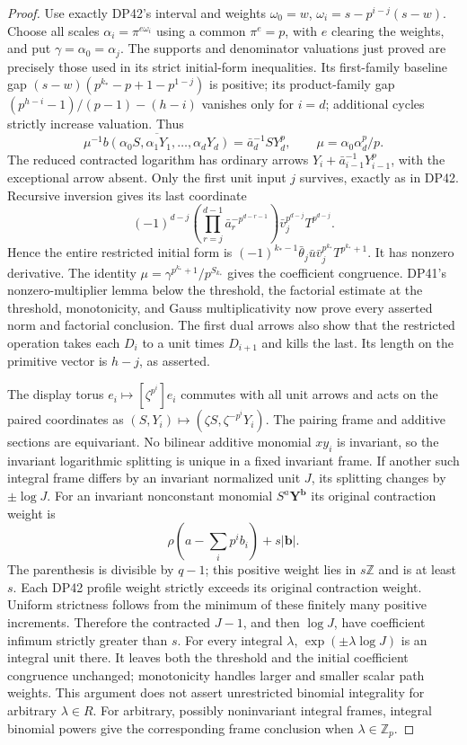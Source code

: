 \documentclass[11pt,a4paper]{article}
\theoremstyle{definition}\newtheorem{remark}[theorem]{Remark}
\newcommand{\Z}{\mathbb Z}\newcommand{\Q}{\mathbb Q}\newcommand{\F}{\mathbb F}
\begin{document}
\begin{proof}
Use exactly DP42's interval and weights
$\omega_0=w$, $\omega_i=s-p^{i-j}(s-w)$.
Choose all scales $\alpha_i=\pi^{e\omega_i}$ using a common $\pi^e=p$, with $e$ clearing the weights, and put $\gamma=\alpha_0=\alpha_j$.
The supports and denominator valuations just proved are precisely those used in its strict initial-form inequalities. Its first-family baseline gap
$(s-w)(p^{k_*}-p+1-p^{1-j})$ is positive; its product-family gap
$(p^{h-i}-1)/(p-1)-(h-i)$ vanishes only for $i=d$; additional cycles strictly increase valuation. Thus
\[
 \overline{\mu^{-1}b(\alpha_0S,\alpha_1Y_1,\ldots,\alpha_dY_d)}
       =\bar a_d^{-1}SY_d^p,\qquad \mu=\alpha_0\alpha_d^p/p.
\]
The reduced contracted logarithm has ordinary arrows
$Y_i+\bar a_{i-1}^{-1}Y_{i-1}^p$, with the exceptional arrow absent.
Only the first unit input $j$ survives, exactly as in DP42.
Recursive inversion gives its last coordinate
\[
 (-1)^{d-j}
 \left(\prod_{r=j}^{d-1}\bar a_r^{-p^{d-r-1}}\right)
 \bar v_j^{p^{d-j}}T^{p^{d-j}}.
\]
Hence the entire restricted initial form is
$(-1)^{k_*-1}\bar\theta_j\bar u\bar v_j^{p^{k_*}}T^{p^{k_*}+1}$.
It has nonzero derivative. The identity
$\mu=\gamma^{p^{k_*}+1}/p^{S_{k_*}}$ gives the coefficient congruence.
DP41's nonzero-multiplier lemma below the threshold, the factorial estimate at the threshold, monotonicity, and Gauss multiplicativity now prove every asserted norm and factorial conclusion.
The first dual arrows also show that the restricted operation takes each $D_i$ to a unit times $D_{i+1}$ and kills the last. Its length on the primitive vector is $h-j$, as asserted.

The display torus $e_i\mapsto[\zeta^{p^i}]e_i$ commutes with all unit arrows and acts on the paired coordinates as
$(S,Y_i)\mapsto(\zeta S,\zeta^{-p^i}Y_i)$.
The pairing frame and additive sections are equivariant. No bilinear additive monomial $xy_i$ is invariant, so the invariant logarithmic splitting is unique in a fixed invariant frame.
If another such integral frame differs by an invariant normalized unit $J$, its splitting changes by $\pm\log J$.
For an invariant nonconstant monomial $S^a\mathbf Y^{\mathbf b}$ its original contraction weight is
\[
 \rho\left(a-\sum_ip^ib_i\right)+s|\mathbf b|.
\]
The parenthesis is divisible by $q-1$; this positive weight lies in $s\Z$ and is at least $s$.
Each DP42 profile weight strictly exceeds its original contraction weight. Uniform strictness follows from the minimum of these finitely many positive increments. Therefore the contracted $J-1$, and then $\log J$, have coefficient infimum strictly greater than $s$.
For every integral $\lambda$, $\exp(\pm\lambda\log J)$ is an integral unit there. It leaves both the threshold and the initial coefficient congruence unchanged; monotonicity handles larger and smaller scalar path weights.
This argument does not assert unrestricted binomial integrality for arbitrary $\lambda\in R$. For arbitrary, possibly noninvariant integral frames, integral binomial powers give the corresponding frame conclusion when $\lambda\in\Z_p$.


\end{proof}
\end{document}
